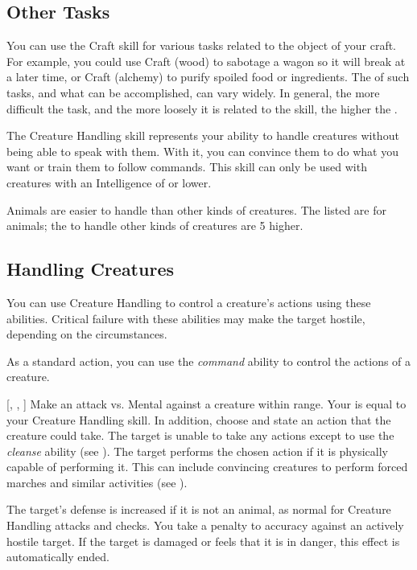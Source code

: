     \subsection{Other Tasks}
        You can use the Craft skill for various tasks related to the object of your craft. For example, you could use Craft (wood) to sabotage a wagon so it will break at a later time, or Craft (alchemy) to purify spoiled food or ingredients. The  of such tasks, and what can be accomplished, can vary widely. In general, the more difficult the task, and the more loosely it is related to the skill, the higher the .

\newpage
{}
    The Creature Handling skill represents your ability to handle creatures without being able to speak with them. With it, you can convince them to do what you want or train them to follow commands. This skill can only be used with creatures with an Intelligence of  or lower.

        Animals are easier to handle than other kinds of creatures.
        The  listed are for animals; the  to handle other kinds of creatures are 5 higher.

    \subsection{Handling Creatures}
        You can use Creature Handling to control a creature's actions using these abilities.
        Critical failure with these abilities may make the target hostile, depending on the circumstances.

        As a standard action, you can use the \textit{command} ability to control the actions of a creature.

        \begin{freeability}{}[, , ]
            Make an attack vs. Mental against a creature within \rngmed range.
            Your  is equal to your Creature Handling skill.
            In addition, choose and state an action that the creature could take.
            \hit The target is unable to take any actions except to use the \textit{cleanse} ability (see ).
            \crit The target performs the chosen action if it is physically capable of performing it.
            This can include convincing creatures to perform forced marches and similar activities (see ).
            
            The target's defense is increased if it is not an animal, as normal for Creature Handling attacks and checks.
            You take a  penalty to accuracy against an actively hostile target.
            If the target is damaged or feels that it is in danger, this effect is automatically ended.
        \end{freeability}

